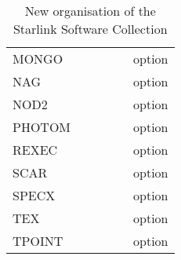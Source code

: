 {\begin{table}
\begin{center}
\begin{tabular}{||l||c|c|c||c||c||}
MONGO     &   &   &   &   & option   \\
NAG       &   &   &   &   & option   \\
NOD2      &   &   &   &   & option   \\
PHOTOM    &   &   &   &   & option   \\
REXEC     &   &   &   &   & option   \\
SCAR      &   &   &   &   & option   \\
SPECX     &   &   &   &   & option   \\
TEX       &   &   &   &   & option   \\
TPOINT    &   &   &   &   & option   \\
\hline
\end {tabular}
\caption {New organisation of the Starlink Software Collection}
\end{center}
\end{table}}


